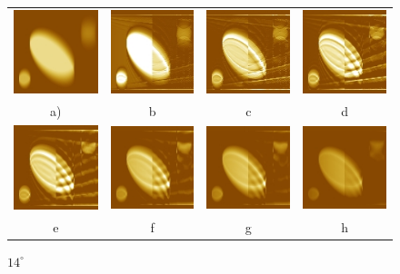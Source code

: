 \documentclass{procDDs}
\begin{document}
\begin{figure}[h!]\center
	\begin{tabular}{cccc}
		\includegraphics[width=0.2\linewidth]{img/13/1.jpg}
		&
		\includegraphics[width=0.2\linewidth]{img/13/3.jpg}
		&
		\includegraphics[width=0.2\linewidth]{img/13/4.jpg}
		&
		\includegraphics[width=0.2\linewidth]{img/13/5.jpg}
		\\
		a) & b & c & d
		\\
		\includegraphics[width=0.2\linewidth]{img/13/6.jpg}
		&
		\includegraphics[width=0.2\linewidth]{img/13/7.jpg}
		&
		\includegraphics[width=0.2\linewidth]{img/13/8.jpg}
		&
		\includegraphics[width=0.2\linewidth]{img/13/9.jpg}
		\\
		e & f & g & h
	\end{tabular}
	\caption{$14^\circ$}
	\label{ris:desc5}
\end{figure}
\end{document}
